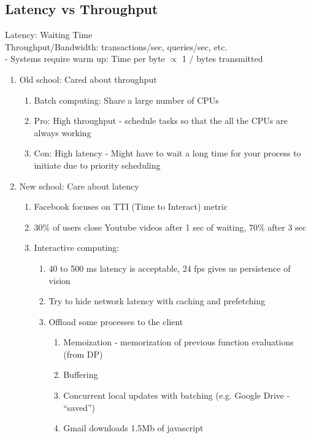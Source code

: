 \documentclass[twoside]{article}
\begin{document}
\subsection{Latency vs Throughput}
Latency: Waiting Time\\
Throughput/Bandwidth: transactions/sec, queries/sec, etc.\\
- Systems require warm up: Time per byte $\propto$ 1 / bytes transmitted
\begin{enumerate}
\item Old school: Cared about throughput
	\begin{enumerate}
	\item Batch computing: Share a large number of CPUs
		\item Pro: High throughput - schedule tasks so that the all the CPUs are always working
		\item Con: High latency - Might have to wait a long time for your process to initiate due to priority scheduling
	\end{enumerate}
\item New school: Care about latency
	\begin{enumerate}
	\item Facebook focuses on TTI (Time to Interact) metric
	\item 30\% of users close Youtube videos after 1 sec of waiting, 70\% after 3 sec
	\item Interactive computing:
		\begin{enumerate}
		\item 40 to 500 ms latency is acceptable, 24 fps gives us persistence of vision
		\item Try to hide network latency with caching and prefetching
		\item Offload some processes to the client
			\begin{enumerate}
			\item Memoization - memorization of previous function evaluations (from DP)
			\item Buffering
			\item Concurrent local updates with batching (e.g. Google Drive - ``saved'')
			\item Gmail downloads 1.5Mb of javascript
			\end{enumerate}
		\end{enumerate}
	\end{enumerate}
\end{enumerate}
\end{document}
